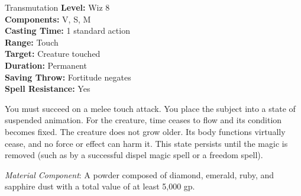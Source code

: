 {Transmutation}
{
	\textbf{Level:}
	Wiz 8\\
	\textbf{Components:}
	V, S, M\\
	\textbf{Casting Time:}
	1 standard action\\
	\textbf{Range:}
	Touch\\
	\textbf{Target:}
	Creature touched\\
	\textbf{Duration:}
	Permanent\\
	\textbf{Saving Throw:}
	Fortitude negates\\
	\textbf{Spell Resistance:}
	Yes\\
}
{
	You must succeed on a melee touch attack. You place the subject into a state of suspended animation. For the creature, time ceases to flow and its condition becomes fixed. The creature does not grow older. Its body functions virtually cease, and no force or effect can harm it. This state persists until the magic is removed (such as by a successful dispel magic spell or a freedom spell).

	\textit{Material Component}:
	A powder composed of diamond, emerald, ruby, and sapphire dust with a total value of at least 5,000 gp.

}

